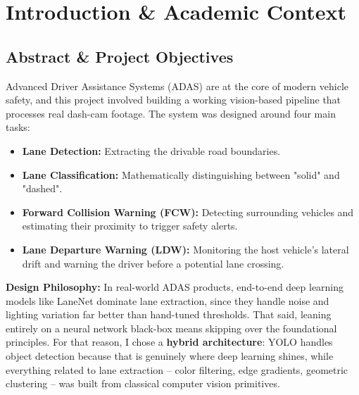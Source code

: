 \documentclass[a4paper, 11pt]{article}
\begin{document}
	\section{Introduction \& Academic Context}
	
	\subsection{Abstract \& Project Objectives}
	Advanced Driver Assistance Systems (ADAS) are at the core of modern vehicle safety, and this project involved building a working vision-based pipeline that processes real dash-cam footage. The system was designed around four main tasks:
	\begin{itemize}
		\item \textbf{Lane Detection:} Extracting the drivable road boundaries.
		\item \textbf{Lane Classification:} Mathematically distinguishing between "solid" and "dashed".
		\item \textbf{Forward Collision Warning (FCW):} Detecting surrounding vehicles and estimating their proximity to trigger safety alerts.
		\item \textbf{Lane Departure Warning (LDW):} Monitoring the host vehicle's lateral drift and warning the driver before a potential lane crossing.
	\end{itemize}
	
	\textbf{Design Philosophy:} In real-world ADAS products, end-to-end deep learning models like LaneNet dominate lane extraction, since they handle noise and lighting variation far better than hand-tuned thresholds. That said, leaning entirely on a neural network black-box means skipping over the foundational principles. For that reason, I chose a \textbf{hybrid architecture}: YOLO handles object detection because that is genuinely where deep learning shines, while everything related to lane extraction -- color filtering, edge gradients, geometric clustering -- was built from classical computer vision primitives.
	
\end{document}
